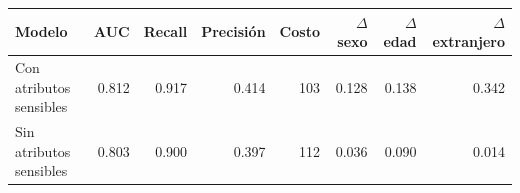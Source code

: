 \begin{tabular}{lrrrrrrr}
\toprule
Modelo & AUC & Recall & Precisión & Costo & $\Delta$ sexo & $\Delta$ edad & $\Delta$ extranjero \\
\midrule
Con atributos sensibles & \num{0.812} & \num{0.917} & \num{0.414} & \num{103} & \num{0.128} & \num{0.138} & \num{0.342} \\
Sin atributos sensibles & \num{0.803} & \num{0.900} & \num{0.397} & \num{112} & \num{0.036} & \num{0.090} & \num{0.014} \\
\bottomrule
\end{tabular}
